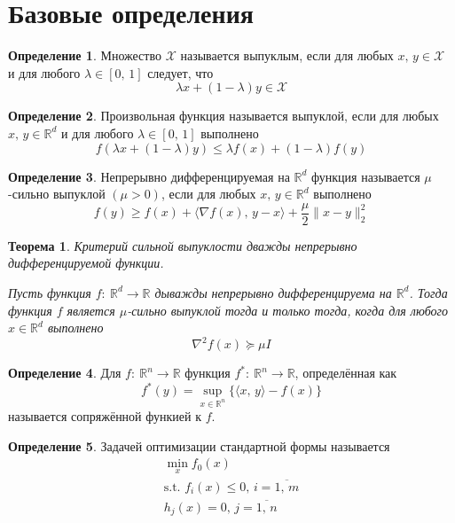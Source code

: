\documentclass[a4paper,12pt]{article}
\renewcommand{\leq}{\ensuremath{\leqslant}}
\renewcommand{\geq}{\ensuremath{\geqslant}}
\theoremstyle{plain}
\newtheorem{theorem}{Теорема}[section]
\theoremstyle{definition}
\newtheorem{definition}{Определение}[section]
\theoremstyle{remark}
\begin{document}
\tableofcontents
\newpage

\section{Базовые определения}
\begin{definition}
	Множество $\mathcal{X}$ называется выпуклым, если для любых $x,\, y \in \mathcal{X}$ и для любого $\lambda \in [0,\, 1]$ следует, что
	\[
		\lambda x + (1 - \lambda)y \in \mathcal{X}
	\]
\end{definition}

\begin{definition}
	Произвольная функция называется выпуклой, если для любых $x,\, y \in \mathbb{R}^d$ и для любого $\lambda \in [0,\,1]$ выполнено
	\[
		f(\lambda x + (1 - \lambda)y) \leq \lambda f(x) + (1 - \lambda)f(y)
	\]
\end{definition}

\begin{definition}
	Непрерывно дифференцируемая на $\mathbb{R}^d$ функция называется $\mu$-сильно выпуклой $(\mu > 0)$, если для любых $x,\, y \in \mathbb{R}^d$ выполнено
	\[
		f(y) \geq f(x) + \langle\nabla f(x),\, y - x\rangle + \frac{\mu}{2}\|x - y\|_2^2
	\]
\end{definition}

\begin{theorem}
	Критерий сильной выпуклости дважды непрерывно дифференцируемой функции.

	Пусть функция $f:\: \mathbb{R}^d \to \mathbb{R}$ дыважды непрерывно дифференцируема на $\mathbb{R}^d$. Тогда функция $f$ является $\mu$-сильно выпуклой тогда и только тогда, когда для любого $x \in \mathbb{R}^d$ выполнено
	\[
		\nabla^2 f(x) \succeq \mu I
	\]
\end{theorem}

\begin{definition}
	Для $f:\: \mathbb{R}^n \to \mathbb{R}$ функция $f^* :\: \mathbb{R}^n \to \mathbb{R}$, определённая как
	\[
		f^*(y) = \sup_{x \in \mathbb{R}^n} \{\langle x,\,y\rangle - f(x)\}
	\]
	называется сопряжённой функией к $f$.
\end{definition}

\begin{definition}
	Задачей оптимизации стандартной формы называется
	\begin{align}\label{CondTask}
		\min_x f_0(x)                                      \\
		\text{s.t. } f_i(x) \leq 0,\, i = \overline{1,\,m} \\
		h_j(x) = 0,\, j = \overline{1,\,n}
	\end{align}
\end{definition}
\end{document}
